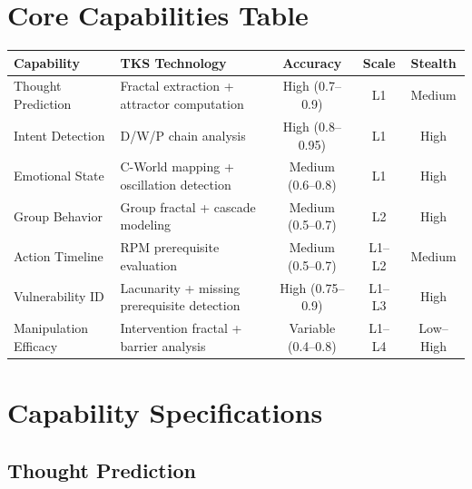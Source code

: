 \documentclass[11pt,twoside]{book}
\renewcommand{\arraystretch}{1.2}
\begin{document}
\section{Core Capabilities Table}

\begin{center}
\small
\renewcommand{\arraystretch}{1.5}
\begin{tabularx}{\textwidth}{>{\raggedright\arraybackslash}p{2.5cm}|>{\raggedright\arraybackslash}p{3cm}|c|c|c}
\toprule
\textbf{Capability} & \textbf{TKS Technology} & \textbf{Accuracy} & \textbf{Scale} & \textbf{Stealth} \\
\midrule
Thought Prediction & Fractal extraction + attractor computation & High (0.7--0.9) & L1 & Medium \\
\hline
Intent Detection & D/W/P chain analysis & High (0.8--0.95) & L1 & High \\
\hline
Emotional State & C-World mapping + oscillation detection & Medium (0.6--0.8) & L1 & High \\
\hline
Group Behavior & Group fractal + cascade modeling & Medium (0.5--0.7) & L2 & High \\
\hline
Action Timeline & RPM prerequisite evaluation & Medium (0.5--0.7) & L1--L2 & Medium \\
\hline
Vulnerability ID & Lacunarity + missing prerequisite detection & High (0.75--0.9) & L1--L3 & High \\
\hline
Manipulation Efficacy & Intervention fractal + barrier analysis & Variable (0.4--0.8) & L1--L4 & Low--High \\
\bottomrule
\end{tabularx}
\end{center}

\section{Capability Specifications}

\subsection{Thought Prediction}
\end{document}
